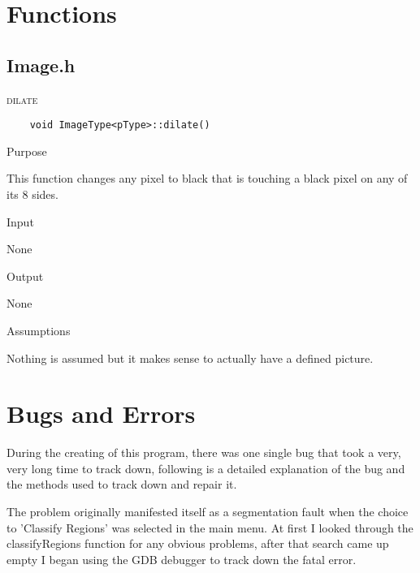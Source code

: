 \documentclass[pdftex, 11pt]{article}
\begin{document}
\section{Functions}

\subsection{Image.h}

\begin{description}

		\item{\textsc{dilate}}
			\begin{description}

	\begin{lstlisting}
	void ImageType<pType>::dilate()
	\end{lstlisting}

				\item{Purpose}

					This function changes any pixel to black that is
					touching a black pixel on any of its 8 sides.

				\item{Input}

					None

				\item{Output}

					None

				\item{Assumptions}

					Nothing is assumed but it makes sense to
					actually have a defined picture.

			\end{description}

\end{description}

\section{Bugs and Errors}

During the creating of this program, there was one single bug that took a very, very long time to track down, following
is a detailed explanation of the bug and the methods used to track down and repair it.

The problem originally manifested itself as a segmentation fault when the choice to 'Classify Regions' was selected in
the main menu.  At first I looked through the classifyRegions function for any obvious problems, after that search came
up empty I began using the GDB debugger to track down the fatal error.
\end{document}
